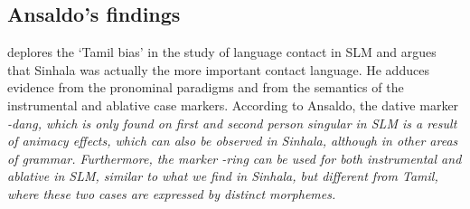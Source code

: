 \documentclass[a4paper,10pt]{article}
\begin{document}

\subsection{Ansaldo's findings}
\citet{Ansaldo2008genesis,Ansaldo2009book} deplores the `Tamil bias' in the study of language contact in SLM and argues that Sinhala was actually the more important contact language. He adduces evidence from the pronominal paradigms and from the semantics of the instrumental and ablative case markers. According to Ansaldo, the dative marker \em -dang\em, which is only found on first and second person singular in SLM is a result of animacy effects, which can also be observed in Sinhala, although in other areas of grammar. Furthermore, the marker \em -ring \em can be used for both instrumental and ablative in SLM, similar to what we find in Sinhala, but different from Tamil, where these two cases are expressed by distinct morphemes.
\end{document}
